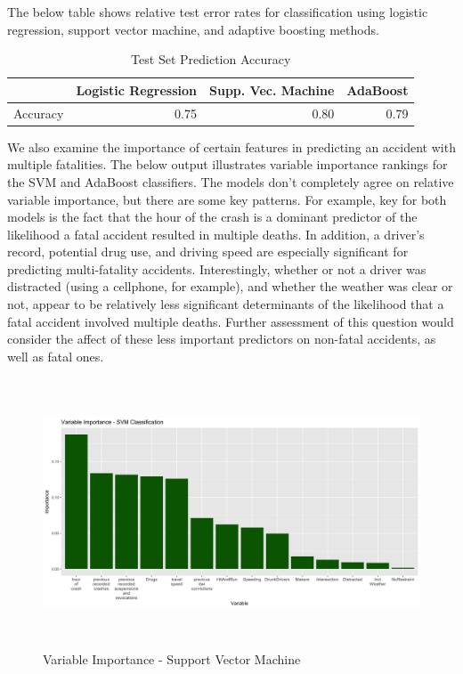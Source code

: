 \documentclass[11pt, oneside,titlepage]{article}   	%
\begin{document}
The below table shows relative test error rates for classification using logistic regression, support vector machine, and adaptive boosting methods. \\

\begin{table}[ht]
\centering
\begin{tabular}{rrrr}
  \hline
 & Logistic Regression & Supp. Vec. Machine & AdaBoost \\ 
  \hline
Accuracy & 0.75 & 0.80 & 0.79 \\ 
   \hline
\end{tabular}
\caption{Test Set Prediction Accuracy} 
\end{table}

We also examine the importance of certain features in predicting an accident with multiple fatalities. The below output illustrates variable importance rankings for the SVM and AdaBoost classifiers. The models don't completely agree on relative variable importance, but there are some key patterns. For example, key for both models is the fact that the hour of the crash is a dominant predictor of the likelihood a fatal accident resulted in multiple deaths. In addition, a driver's record, potential drug use, and driving speed are especially significant for predicting multi-fatality accidents. Interestingly, whether or not a driver was distracted (using a cellphone, for example), and whether the weather was clear or not, appear to be relatively less significant determinants of the likelihood that a fatal accident involved multiple deaths. Further assessment of this question would consider the affect of these less important predictors on non-fatal accidents, as well as fatal ones. \\

\begin{figure}[H]
\centering
  \includegraphics[width=15cm,height=8cm,keepaspectratio]{ImportancePlot_SVM.png}
\caption{Variable Importance - Support Vector Machine}
\end{figure}
\end{document}
